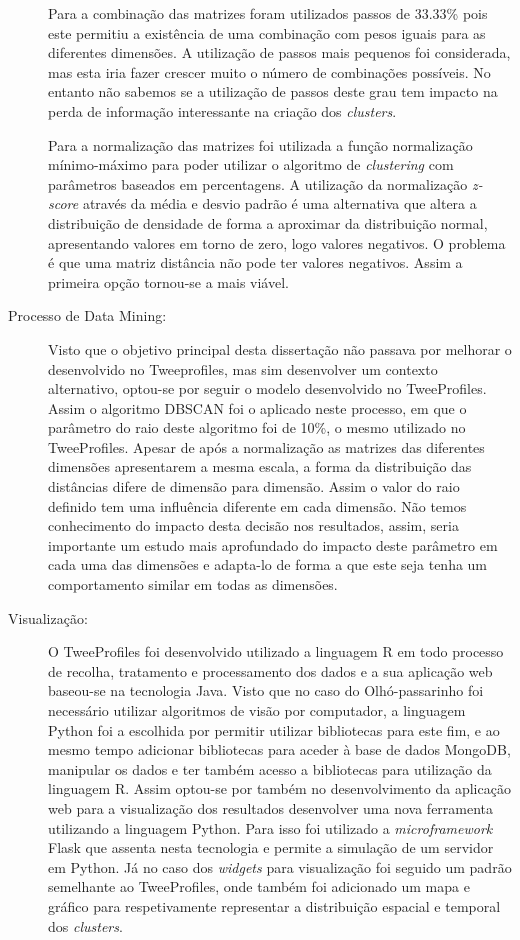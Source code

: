 \begin{description}
Para a combinação das matrizes foram utilizados passos de 33.33\% pois este permitiu a existência de uma combinação com pesos iguais para as diferentes dimensões. A utilização de passos mais pequenos foi considerada, mas esta iria fazer crescer muito o número de combinações possíveis. No entanto não sabemos se a utilização de passos deste grau tem impacto na perda de informação interessante na criação dos \textit{clusters}.

Para a normalização das matrizes foi utilizada a função normalização mínimo-máximo para poder utilizar o algoritmo de \textit{clustering} com parâmetros baseados em percentagens. A utilização da normalização \textit{z-score} através da média e desvio padrão é uma alternativa que altera a distribuição de densidade de forma a aproximar da distribuição normal, apresentando valores em torno de zero, logo valores negativos. O problema é que uma matriz distância não pode ter valores negativos. Assim a primeira opção tornou-se a mais viável.

\item [Processo de Data Mining:]
Visto que o objetivo principal desta dissertação não passava por melhorar o desenvolvido no Tweeprofiles, mas sim desenvolver um contexto alternativo, optou-se por seguir o modelo desenvolvido no TweeProfiles. Assim o algoritmo DBSCAN foi o aplicado neste processo, em que o parâmetro do raio deste algoritmo foi de 10\%, o mesmo utilizado no TweeProfiles. Apesar de após a normalização as matrizes das diferentes dimensões apresentarem a mesma escala, a forma da distribuição das distâncias difere de dimensão para dimensão. Assim o valor do raio definido tem uma influência diferente em cada dimensão. Não temos conhecimento do impacto desta decisão nos resultados, assim, seria importante um estudo mais aprofundado do impacto deste parâmetro em cada uma das dimensões e adapta-lo de forma a que este seja tenha um comportamento similar em todas as dimensões.

\item [Visualização:]
O TweeProfiles foi desenvolvido utilizado a linguagem R em todo processo de recolha, tratamento e processamento dos dados e a sua aplicação web baseou-se na tecnologia Java. Visto que no caso do Olhó-passarinho foi necessário utilizar algoritmos de visão por computador, a linguagem Python foi a escolhida por permitir utilizar bibliotecas para este fim, e ao mesmo tempo adicionar bibliotecas para aceder à base de dados MongoDB, manipular os dados e ter também acesso a bibliotecas para utilização da linguagem R. Assim optou-se por também no desenvolvimento da aplicação web para a visualização dos resultados desenvolver uma nova ferramenta utilizando a linguagem Python. Para isso foi utilizado a \textit{microframework} Flask que assenta nesta tecnologia e permite a simulação de um servidor em Python. Já no caso dos \textit{widgets} para visualização foi seguido um padrão semelhante ao TweeProfiles, onde também foi adicionado um mapa e gráfico para respetivamente representar a distribuição espacial e temporal dos \textit{clusters}. 


\end{description}
